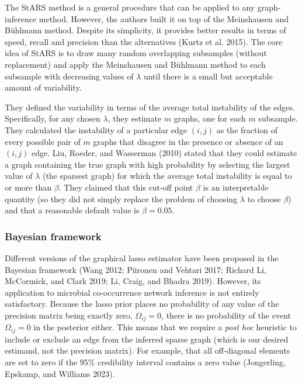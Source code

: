 \documentclass[
  a4paper,
]{article}
\begin{document}
The StARS method is a general procedure that can be applied to any
graph-inference method. However, the authors built it on top of the
Meinshausen and Bühlmann method. Despite its simplicity, it provides
better results in terms of speed, recall and precision than the
alternatives (Kurtz et al. 2015). The core idea of StARS is to draw many
random overlapping subsamples (without replacement) and apply the
Meinshausen and Bühlmann method to each subsample with decreasing values
of \(\lambda\) until there is a small but acceptable amount of
variability.

They defined the variability in terms of the average total instability
of the edges. Specifically, for any chosen \(\lambda\), they estimate
\(m\) graphs, one for each \(m\) subsample. They calculated the
instability of a particular edge \((i, j)\) as the fraction of every
possible pair of \(m\) graphs that disagree in the presence or absence
of an \((i, j)\) edge. Liu, Roeder, and Wasserman (2010) stated that
they could estimate a graph containing the true graph with high
probability by selecting the largest value of \(\lambda\) (the sparsest
graph) for which the average total instability is equal to or more than
\(\beta\). They claimed that this cut-off point \(\beta\) is an
interpretable quantity (so they did not simply replace the problem of
choosing \(\lambda\) to choose \(\beta\)) and that a reasonable default
value is \(\beta = 0.05\).

\hypertarget{bayesian-framework}{%
\subsubsection{Bayesian framework}\label{bayesian-framework}}

Different versions of the graphical lasso estimator have been proposed
in the Bayesian framework (Wang 2012; Piironen and Vehtari 2017; Richard
Li, McCormick, and Clark 2019; Li, Craig, and Bhadra 2019). However, its
application to microbial co-occurrence network inference is not entirely
satisfactory. Because the lasso prior places no probability of any value
of the precision matrix being exactly zero, \(\Omega_{ij}=0\), there is
no probability of the event \(\Omega_{ij}=0\) in the posterior either.
This means that we require a \emph{post hoc} heuristic to include or
exclude an edge from the inferred sparse graph (which is our desired
estimand, not the precision matrix). For example, that all off-diagonal
elements are set to zero if the 95\% credibility interval contains a
zero value (Jongerling, Epskamp, and Williams 2023).
\end{document}
